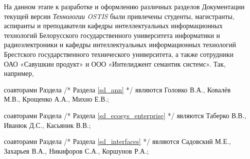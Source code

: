 \begin{SCn}
{На данном этапе к разработке и оформлению различных разделов Документации текущей версии \textit{Технологии OSTIS} были привлечены студенты, магистранты, аспиранты и преподаватели кафедры интеллектуальных информационных технологий Белорусского государственного университета информатики и радиоэлектроники и кафедры интеллектуальных информационных технологий Брестского государственного технического университета, а также сотрудники ОАО «Савушкин продукт» и ООО «Интелиджент семантик системс». Так, например,
\begin{scnitemize}
\item соавторами Раздела  /* Раздела \ref{sd_ann} */ являются Головко В.А., Ковалёв М.В., Крощенко А.А., Михно Е.В.;
\item соавторами Раздела  /* Раздела \ref{sd_ecosys_enterprise} */ являются Таберко В.В., Иванюк Д.С., Касьяник В.В.;
\item соавторами Раздела  /* Раздела \ref{sd_interfaces} */ являются Садовский М.Е., Захарьев В.А., Никифоров С.А., Коршунов Р.А.;
\end{scnitemize}
}


\scnendstruct

\end{SCn}

